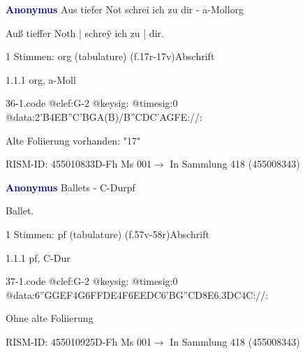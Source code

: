 \documentclass[twocolumn]{book}
\begin{document}
\par \vspace{7pt} \textcolor{darkblue}{\textbf{Anonymus  }}\hfillplus{\textbf{[36]}}\newline Aus tiefer Not schrei ich zu dir - a-Moll\newline org
\par \begin{itshape}[f.17r, at left:] Auß tieffer Noth | schreÿ ich zu | dir.\end{itshape} 
\par \textcolor{darkblue}{}  1 Stimmen: org (tabulature)  (f.17r-17v)\newline Abschrift
\par 1.1.1  org, a-Moll  
\begin{filecontents*}{36-1.code}
@clef:G-2
@keysig:
@timesig:0
@data:2'B4EB''C'BGA(B)/B''CDC'AGFE://:
\end{filecontents*}
\newline
%
\par Alte Foliierung vorhanden: "17"
\par RISM-ID: 455010833\newline D-Fh  Ms 001\newline $\rightarrow$ In Sammlung 418 (455008343)
      
\par \vspace{7pt} \textcolor{darkblue}{\textbf{Anonymus  }}\hfillplus{\textbf{[37]}}\newline Ballets - C-Dur\newline pf
\par \begin{itshape}[f.57v, at left:] Ballet.\end{itshape} 
\par \textcolor{darkblue}{}  1 Stimmen: pf (tabulature)  (f.57v-58r)\newline Abschrift
\par 1.1.1  pf, C-Dur  
\begin{filecontents*}{37-1.code}
@clef:G-2
@keysig:
@timesig:0
@data:{6''GGEF}4G{6FFDE}4F{6EEDC}{6'BG''CD}{8E6.3DC}4C://:
\end{filecontents*}
\newline
%
\par Ohne alte Foliierung
\par RISM-ID: 455010925\newline D-Fh  Ms 001\newline $\rightarrow$ In Sammlung 418 (455008343)
      
\end{document}
